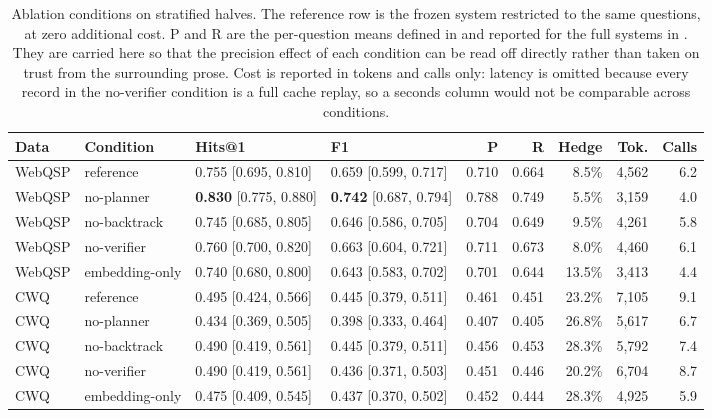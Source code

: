 \begin{table}[!tb]
  \begin{center}
    \caption[Ablation conditions on stratified halves]{Ablation conditions on
    stratified halves. The reference row is the frozen system restricted to the
    same questions, at zero additional cost. P and R are the per-question means
    defined in  and reported for the full systems in
    . They are carried here so that the precision effect of each
    condition can be read off directly rather than taken on trust from the
    surrounding prose. Cost is reported in tokens and calls only: latency is
    omitted because every record in the \textsf{no-verifier} condition is a full
    cache replay, so a seconds column would not be comparable across
    conditions.}
    \label{tab:ablation}
    \footnotesize
    \setlength{\tabcolsep}{3pt}
    \begin{tabular}{|l|l|l|l|r|r|r|r|r|}
      \hline
      \textbf{Data} & \textbf{Condition} & \textbf{Hits@1} & \textbf{F1} &
      \textbf{P} & \textbf{R} & \textbf{Hedge} & \textbf{Tok.} &
        \textbf{Calls} \\
      \hline
      WebQSP & reference       & 0.755 [0.695, 0.810] & 0.659 [0.599, 0.717] &
        0.710 & 0.664 & 8.5\%  & 4{,}562 & 6.2 \\
      WebQSP & no-planner      & \textbf{0.830} [0.775, 0.880] &
        \textbf{0.742} [0.687, 0.794] & 0.788 & 0.749 & 5.5\%  & 3{,}159 &
        4.0 \\
      WebQSP & no-backtrack    & 0.745 [0.685, 0.805] & 0.646 [0.586, 0.705] &
        0.704 & 0.649 & 9.5\%  & 4{,}261 & 5.8 \\
      WebQSP & no-verifier     & 0.760 [0.700, 0.820] & 0.663 [0.604, 0.721] &
        0.711 & 0.673 & 8.0\%  & 4{,}460 & 6.1 \\
      WebQSP & embedding-only  & 0.740 [0.680, 0.800] & 0.643 [0.583, 0.702] &
        0.701 & 0.644 & 13.5\% & 3{,}413 & 4.4 \\
      \hline
      CWQ & reference       & 0.495 [0.424, 0.566] & 0.445 [0.379, 0.511] &
        0.461 & 0.451 & 23.2\% & 7{,}105 & 9.1 \\
      CWQ & no-planner      & 0.434 [0.369, 0.505] & 0.398 [0.333, 0.464] &
        0.407 & 0.405 & 26.8\% & 5{,}617 & 6.7 \\
      CWQ & no-backtrack    & 0.490 [0.419, 0.561] & 0.445 [0.379, 0.511] &
        0.456 & 0.453 & 28.3\% & 5{,}792 & 7.4 \\
      CWQ & no-verifier     & 0.490 [0.419, 0.561] & 0.436 [0.371, 0.503] &
        0.451 & 0.446 & 20.2\% & 6{,}704 & 8.7 \\
      CWQ & embedding-only  & 0.475 [0.409, 0.545] & 0.437 [0.370, 0.502] &
        0.452 & 0.444 & 28.3\% & 4{,}925 & 5.9 \\
      \hline
    \end{tabular}
  \end{center}
\end{table}

